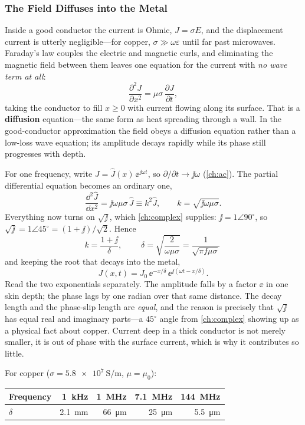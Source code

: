 \subsubsection*{The Field Diffuses into the Metal}
Inside a good conductor the current is Ohmic, \(J=\sigma E\), and the displacement
current is utterly negligible---for copper, \(\sigma\gg\omega\varepsilon\) until far
past microwaves. Faraday's law couples the electric and magnetic curls, and
eliminating the magnetic field between them leaves one equation for the current with
\emph{no wave term at all}:
\[
\frac{\partial^2 J}{\partial x^2}=\mu\sigma\,\frac{\partial J}{\partial t},
\]
taking the conductor to fill \(x\ge0\) with current flowing along its surface. That
is a \textbf{diffusion} equation---the same form as heat spreading through a wall.
In the good-conductor approximation the field obeys a diffusion equation rather
than a low-loss wave equation; its amplitude decays rapidly while its phase still
progresses with depth.

For one frequency, write \(J=\hat J(x)\,\ee^{\jj\omega t}\), so
\(\partial/\partial t\to\jj\omega\) (\cref{ch:ac}). The partial differential
equation becomes an ordinary one,
\[
\frac{\dd^2\hat J}{\dd x^2}=\jj\omega\mu\sigma\,\hat J\equiv k^2\hat J,
\qquad
k=\sqrt{\jj\omega\mu\sigma} .
\]
Everything now turns on \(\sqrt{\jj}\), which \cref{ch:complex} supplies:
\(\jj=1\angle90^\circ\), so \(\sqrt{\jj}=1\angle45^\circ=(1+\jj)/\sqrt2\). Hence
\[
k=\frac{1+\jj}{\delta},
\qquad
\boxed{\;\delta=\sqrt{\frac{2}{\omega\mu\sigma}}=\frac{1}{\sqrt{\pi f\mu\sigma}}\;}
\]
\cite[pp.~51--52]{white2004highfrequency}
and keeping the root that decays into the metal,
\[
J(x,t)=J_0\,\ee^{-x/\delta}\,\ee^{\jj(\omega t-x/\delta)} .
\]
Read the two exponentials separately. The amplitude falls by a factor \(\ee\) in one
skin depth; the phase lags by one radian over that same distance. The decay length
and the phase-slip length are \emph{equal}, and the reason is precisely that
\(\sqrt{\jj}\) has equal real and imaginary parts---a \(45^\circ\) angle from
\cref{ch:complex} showing up as a physical fact about copper. Current deep in a thick
conductor is not merely smaller, it is out of phase with the surface current, which
is why it contributes so little.

For copper (\(\sigma=\SI{5.8e7}{\siemens\per\meter}\), \(\mu=\mu_0\)):

\begin{center}
\begin{tabular}{@{}lrrrr@{}}
\toprule
Frequency & \SI{1}{\kilo\hertz} & \SI{1}{\mega\hertz} & \SI{7.1}{\mega\hertz} & \SI{144}{\mega\hertz} \\
\midrule
\(\delta\) & \SI{2.1}{\milli\meter} & \SI{66}{\micro\meter} & \SI{25}{\micro\meter} & \SI{5.5}{\micro\meter} \\
\bottomrule
\end{tabular}
\end{center}

